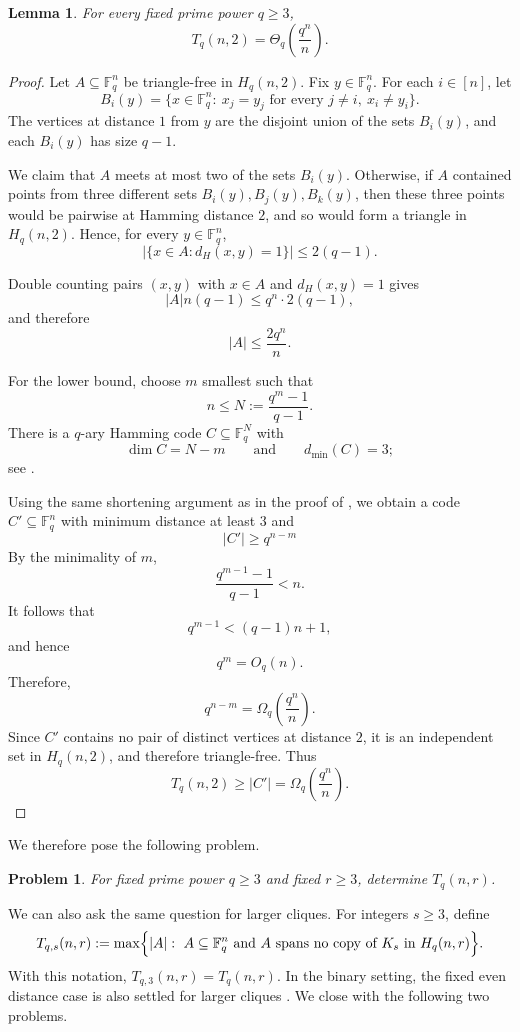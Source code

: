 \documentclass[11pt]{article}
\theoremstyle{plain}
\newtheorem{lemma}{Lemma}
\newtheorem{problem}{Problem}
\newcommand{\F}{\mathbb{F}}
\newcommand{\dist}{d_H}
\begin{document}
\begin{lemma}\label{lem:qary-r2}
For every fixed prime power $q\ge 3$,
\[
T_q(n,2)=\Theta_q\!\left(\frac{q^n}{n}\right).
\]
\end{lemma}
\begin{proof}
Let $A\subseteq\F_q^n$ be triangle-free in $H_q(n,2)$.
Fix $y\in\F_q^n$.  For each $i\in[n]$, let
\[
B_i(y)=\{x\in\F_q^n:\ x_j=y_j \text{ for every } j\ne i,\ x_i\ne y_i\}.
\]
The vertices at distance $1$ from $y$ are the disjoint union of the sets
$B_i(y)$, and each $B_i(y)$ has size $q-1$.

We claim that $A$ meets at most two of the sets $B_i(y)$.  Otherwise, if
$A$ contained points from three different sets $B_i(y),B_j(y),B_k(y)$,
then these three points would be pairwise at Hamming distance $2$, and so
would form a triangle in $H_q(n,2)$.  Hence, for every $y\in\F_q^n$,
\[
|\{x\in A:\dist(x,y)=1\}|\le 2(q-1).
\]

Double counting pairs $(x,y)$ with $x\in A$ and $\dist(x,y)=1$ gives
\[
|A|n(q-1)\le q^n\cdot 2(q-1),
\]
and therefore
\[
|A|\le \frac{2q^n}{n}.
\]

For the lower bound, choose $m$ smallest such that
\[
n\le N:=\frac{q^m-1}{q-1}.
\]
There is a $q$-ary Hamming code $C\subseteq\F_q^N$ with
\[
\dim C=N-m
\qquad\text{and}\qquad
d_{\min}(C)=3;
\]
see \cite[Ch.~7, \S3, Problem~8(a), pp.~193--194]{MS}.

Using the same shortening argument as in the proof of , we
obtain a code $C'\subseteq\F_q^n$ with minimum distance at least $3$ and
\[
|C'|\ge q^{n-m}
\]
By the minimality of $m$,
\[
\frac{q^{m-1}-1}{q-1}<n.
\]
It follows that
\[
q^{m-1}<(q-1)n+1,
\]
and hence
\[
q^m=O_q(n).
\]
Therefore,
\[
q^{n-m}
=
\Omega_q\!\left(\frac{q^n}{n}\right).
\]
Since $C'$ contains no pair of distinct vertices at distance $2$, it is an
independent set in $H_q(n,2)$, and therefore triangle-free.  Thus
\[
T_q(n,2)\ge |C'|
=\Omega_q\!\left(\frac{q^n}{n}\right).
\]
\end{proof}

\bigskip

We therefore pose the following problem.
\begin{problem}
    For fixed prime power $q\ge3$ and fixed $r\ge3$, determine $T_q(n,r)$.
\end{problem}

We can also ask the same question for larger cliques.
For
integers $s\ge 3$, define
\[
T_{q,s}(n,r)
:=
\max\Bigl\{
|A|:\ A\subseteq \F_q^n
\text{ and } A \text{ spans no copy of } K_s \text{ in } H_q(n,r)
\Bigr\}.
\]
With this notation, $T_{q,3}(n,r)=T_q(n,r)$.
In the binary setting, the fixed even distance case is also settled for
larger cliques \cite{balogh}.
We close with the following two problems.
\end{document}
